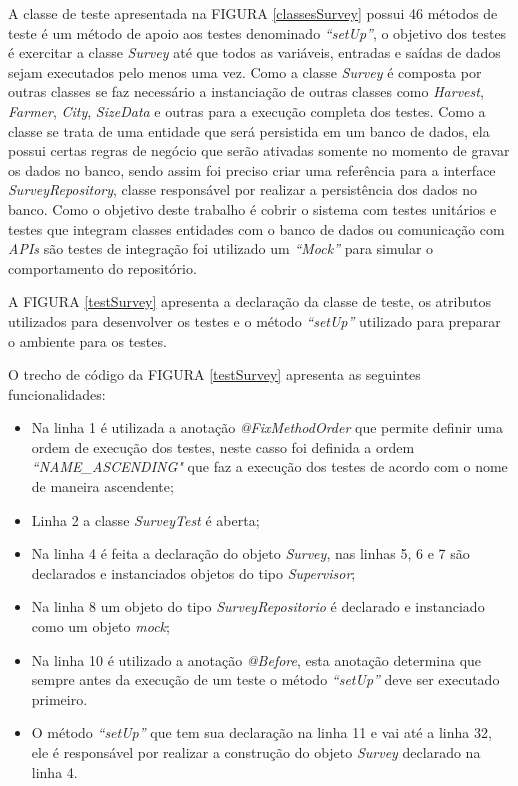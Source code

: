 A classe de teste apresentada na FIGURA \ref{classesSurvey} possui 46 métodos de teste é um método de apoio aos testes denominado \textit{“setUp”}, o objetivo dos testes é exercitar a classe \textit{Survey} até que todos as variáveis, entradas e saídas de dados sejam executados pelo menos uma vez. Como a classe \textit{Survey} é composta por outras classes se faz necessário a instanciação de outras classes como \textit{Harvest}, \textit{Farmer}, \textit{City}, \textit{SizeData} e outras para a execução completa dos testes. Como a classe se trata de uma entidade que será persistida em um banco de dados, ela possui certas regras de negócio que serão ativadas somente no momento de gravar os dados no banco, sendo assim foi preciso criar uma referência para a interface \textit{SurveyRepository}, classe responsável por realizar a persistência dos dados no banco. Como o objetivo deste trabalho é cobrir o sistema com testes unitários e testes que integram classes entidades com o banco de dados ou comunicação com \textit{APIs} são testes de integração foi utilizado um \textit{“Mock”} para simular o comportamento do repositório.


A FIGURA \ref{testSurvey} apresenta a declaração da classe de teste, os atributos utilizados para desenvolver os testes e o método \textit{“setUp”} utilizado para preparar o ambiente para os testes.

O trecho de código da FIGURA \ref{testSurvey} apresenta as seguintes funcionalidades:

\begin{itemize}

    \item Na linha 1 é utilizada a anotação \textit{@FixMethodOrder} que permite definir uma ordem de execução dos testes, neste casso foi definida a ordem \textit{“NAME\_ASCENDING"} que faz a execução dos testes de acordo com o nome de maneira ascendente;
    
    \item Linha 2 a classe \textit{SurveyTest} é aberta;

    \item Na linha 4 é feita a declaração do objeto \textit{Survey}, nas linhas 5, 6 e 7  são declarados e instanciados objetos do tipo \textit{Supervisor};

    \item Na linha 8 um objeto do tipo \textit{SurveyRepositorio} é declarado e instanciado como um objeto \textit{mock};

    \item Na linha 10 é utilizado a anotação \textit{@Before}, esta anotação determina que sempre antes da execução de um teste o método \textit{“setUp”} deve ser executado primeiro.

    \item O método \textit{“setUp”} que tem sua declaração na linha 11 e vai até a linha 32, ele é responsável por realizar a construção do objeto \textit{Survey} declarado na linha 4.

\end{itemize}{}


